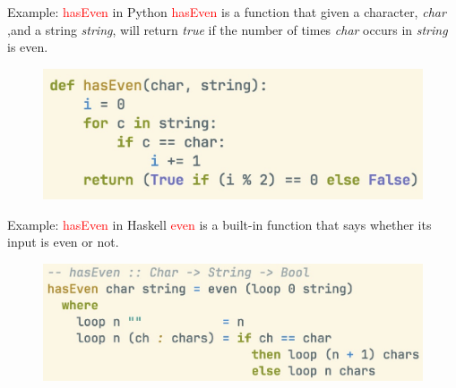 \documentclass[pdf]{beamer}
\newcommand{\code}[1]{\textcolor{Red}{\textsf{#1}}}
\begin{document}
\begin{frame}[fragile]{Example: \code{hasEven} in Python}
  \code{hasEven} is a function that given a character, \textit{char}
  ,and a string \textit{string}, will return \textit{true} if the number
  of times \textit{char} occurs in \textit{string} is even.

  \begin{figure}[H]
    \centering
    \includegraphics[width=\linewidth]{hasEven-py}
  \end{figure}

\end{frame}

\begin{frame}{Example: \code{hasEven} in Haskell}
  \code{even} is a built-in function that says whether its input is even or not.
    \begin{figure}[H]
    \centering
    \includegraphics[width=\linewidth]{hasEven-hs}
  \end{figure}
\end{frame}
\end{document}
